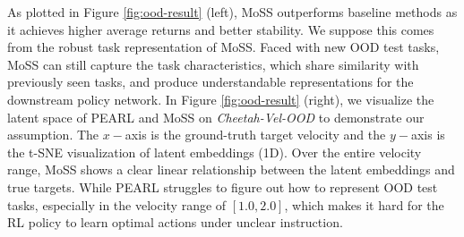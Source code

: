 \documentclass[letterpaper]{article} %
\begin{document}
As plotted in Figure \ref{fig:ood-result} (left), MoSS outperforms baseline methods as it achieves higher average returns and better stability. We suppose this comes from the robust task representation of MoSS. Faced with new OOD test tasks, MoSS can still capture the task characteristics, which share similarity with previously seen tasks, and produce understandable representations for the downstream policy network. In Figure \ref{fig:ood-result} (right), we visualize the latent space of PEARL and MoSS on \emph{Cheetah-Vel-OOD} to demonstrate our assumption. The $x-$axis is the ground-truth target velocity and the $y-$axis is the t-SNE \cite{t-sne} visualization of latent embeddings (1D). Over the entire velocity range, MoSS shows a clear linear relationship between the latent embeddings and true targets. While PEARL struggles to figure out how to represent OOD test tasks, especially in the velocity range of $[1.0, 2.0]$, which makes it hard for the RL policy to learn optimal actions under unclear instruction.






\end{document}
